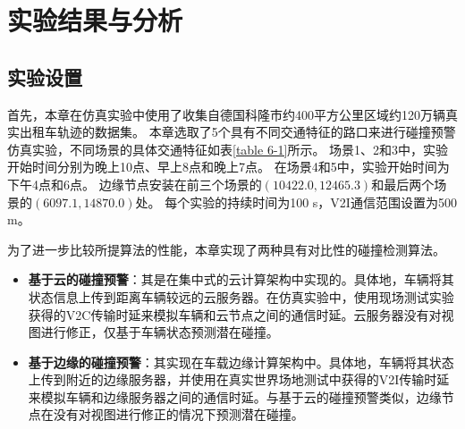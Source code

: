 \section{实验结果与分析}\label{section 5-4}

\subsection{实验设置}

首先，本章在仿真实验中使用了收集自德国科隆市约400平方公里区域约120万辆真实出租车轨迹的数据集\cite{uppoor2013generation}。
本章选取了5个具有不同交通特征的路口来进行碰撞预警仿真实验，不同场景的具体交通特征如表\ref{table 6-1}所示。
场景1、2和3中，实验开始时间分别为晚上10点、早上8点和晚上7点。
在场景4和5中，实验开始时间为下午4点和6点。
边缘节点安装在前三个场景的$(10422.0, 12465.3)$和最后两个场景的$(6097.1, 14870.0)$处。
每个实验的持续时间为100 s，V2I通信范围设置为500 m。

\begin{table}[h]\small
\centering
{}
\label{table 6-1}
\end{table}

为了进一步比较所提算法的性能，本章实现了两种具有对比性的碰撞检测算法。
\begin{itemize}
	\item \textbf{基于云的碰撞预警}：其是在集中式的云计算架构中实现的。具体地，车辆将其状态信息上传到距离车辆较远的云服务器。在仿真实验中，使用现场测试实验获得的V2C传输时延来模拟车辆和云节点之间的通信时延。云服务器没有对视图进行修正，仅基于车辆状态预测潜在碰撞。
	\item \textbf{基于边缘的碰撞预警}：其实现在车载边缘计算架构中。具体地，车辆将其状态上传到附近的边缘服务器，并使用在真实世界场地测试中获得的V2I传输时延来模拟车辆和边缘服务器之间的通信时延。与基于云的碰撞预警类似，边缘节点在没有对视图进行修正的情况下预测潜在碰撞。
\end{itemize}

